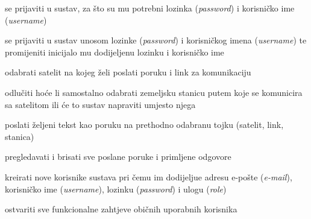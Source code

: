 			
			\begin{packed_enum}
				\item  {}
				
				\begin{packed_enum}
					
					\item se prijaviti u sustav, za što su mu potrebni lozinka (\textit{password}) i korisničko ime (\textit{username})
					
				\end{packed_enum}
			
				\item  {}
				
				\begin{packed_enum}
					
					\item se prijaviti u sustav unosom lozinke (\textit{password}) i korisničkog imena (\textit{username}) te promijeniti inicijalo mu dodijeljenu lozinku i korisničko ime
					\item odabrati satelit na kojeg želi poslati poruku i link za komunikaciju 
					\item odlučiti hoće li samostalno odabrati zemeljsku stanicu putem koje se komunicira sa satelitom ili će to sustav napraviti umjesto njega
					\item poslati željeni tekst kao poruku na prethodno odabranu tojku (satelit, link, stanica)
					\item pregledavati i brisati sve poslane poruke i primljene odgovore
					
				\end{packed_enum}
				
				\item  {}
				
				\begin{packed_enum}
					
				    \item kreirati nove korisnike sustava pri čemu im dodijeljue adresu e-pošte (\textit{e-mail}), korisničko ime (\textit{username}), lozinku (\textit{password}) i ulogu (\textit{role})
					\item ostvariti sve funkcionalne zahtjeve običnih uporabnih korisnika
					
				\end{packed_enum}
					\item  {}
				

\end{packed_enum}
